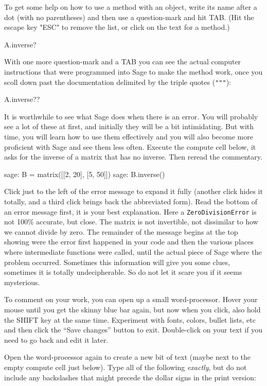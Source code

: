 %
To get some help on how to use a method with an object, write its name after a dot (with no parentheses) and then use a question-mark and hit TAB.  (Hit the escape key "ESC" to remove the list, or click on the text for a method.)
%
\begin{sageverbatim}
A.inverse?
\end{sageverbatim}
%
With one more question-mark and a TAB you can see the actual computer instructions that were programmed into Sage to make the method work, once you scoll down past the documentation delimited by the triple quotes (\verb?"""?):
%
\begin{sageverbatim}
A.inverse??
\end{sageverbatim}
%
It is worthwhile to see what Sage does when there is an error.  You will probably see a lot of these at first, and initially they will be a bit intimidating.  But with time, you will learn how to use them effectively and you will also become more proficient with Sage and see them less often.  Execute the compute cell below, it asks for the inverse of a matrix that has no inverse.  Then reread the commentary.
%
\begin{sageverbatim}
sage: B = matrix([[2, 20], [5, 50]])
sage: B.inverse()
\end{sageverbatim}
%
Click just to the left of the error message to expand it fully (another click hides it totally, and a third click brings back the abbreviated form).  Read the bottom of an error message first, it is your best explanation.  Here a \verb?ZeroDivisionError? is not 100\% accurate, but close.  The matrix is not invertible, not dissimilar to how we cannot divide by zero.  The remainder of the message begins at the top showing were the error first happened in your code and then the various places where intermediate functions were called, until the actual piece of Sage where the problem occurred.  Sometimes this information will give you some clues, sometimes it is totally undecipherable.  So do not let it scare you if it seems mysterious.\par
%
%
To comment on your work, you can open up a small word-processor.  Hover your mouse until you get the skinny blue bar again, but now when you click, also hold the SHIFT key at the same time.  Experiment with fonts, colors, bullet lists, etc and then click the ``Save changes'' button to exit.  Double-click on your text if you need to go back and edit it later.\par
%
Open the word-processor again to create a new bit of text (maybe next to the empty compute cell just below).  Type all of the following \emph{exactly}, but do not include any backslashes that might precede the dollar signs in the print version:
